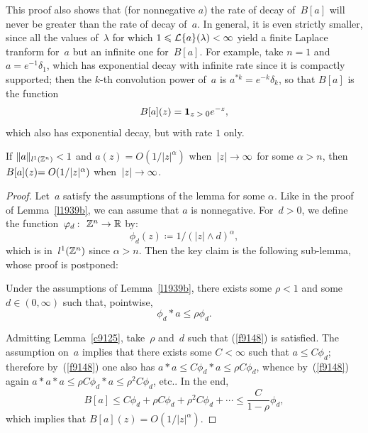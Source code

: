 \begin{Rmk}\label{rmk9890}
This proof also shows that (for nonnegative $a$)
the rate of decay of~$B[a]$ will never be greater than the rate of decay of~$a$.
In general, it is even strictly smaller,
since all the values of~$\lambda$ for which $1\leqslant\mathcal{L}\{a\}(\lambda)<\infty$ yield
a finite Laplace tranform for~$a$ but an infinite one for~$B[a]$.
For example, take $n=1$ and $a = e^{-1}\delta_{1}$,
which has exponential decay with infinite rate since it is compactly supported;
then the $k$-th convolution power of~$a$ is $a^{*k} = e^{-k}\delta_k$,
so that $B[a]$ is the function
\[ B[a](z) = \1{z>0} e^{-z} ,\]
which also has exponential decay, but with rate $1$ only.
\end{Rmk}

\begin{Lem}\label{l1939b}
If $\|a\|_{l^1(\mathbb{Z}^n)} < 1$ and $a(z) = O(1/|z|^\alpha)$ when~$|z|\to\infty$
for some $\alpha > n$, then $B[a](z) \allowbreak {= O(1/|z|^\alpha)}$ when~$|z|\to\infty$.
\end{Lem}

\begin{proof}
Let~$a$ satisfy the assumptions of the lemma for some $\alpha$.
Like in the proof of Lemma~\ref{l1939b}, we can assume that $a$ is nonnegative.
For~$d > 0$, we define the function~$\phi_d \colon \ZZ^n\to\RR$ by:
\[ \phi_d(z) \coloneqq 1/(|z|\wedge d)^\alpha ,\]
which is in~$l^1(\mathbb{Z}^n)$ since $\alpha > n$.
Then the key claim is the following sub-lemma, whose proof is postponed:
%
\begin{Lem}\label{c9125}
Under the assumptions of Lemma~\ref{l1939b},
there exists some $\rho < 1$ and some $d \in (0,\infty)$ such that, pointwise,
\[\label{f9148} \phi_d * a \leq \rho\phi_d .\]
\end{Lem}

Admitting Lemma~\ref{c9125}, take~$\rho$ and~$d$ such that (\ref{f9148}) is satisfied.
The assumption on~$a$ implies that there exists some $C < \infty$ such that $a \leq C\phi_d$;
therefore by~(\ref{f9148}) one also has $a * a \leq C \phi_d * a \leq \rho C \phi_d$,
whence by~(\ref{f9148}) again $a * a * a \leq \rho C \phi_d * a \leq \rho^2 C \phi_d$,
etc.. In the end,
\[ B[a] \leq C \phi_d + \rho C \phi_d + \rho^2 C \phi_d + \cdots \leq \frac{C}{1-\rho} \phi_d ,\]
which implies that $B[a](z) = O(1/|z|^\alpha)$.
\end{proof}


